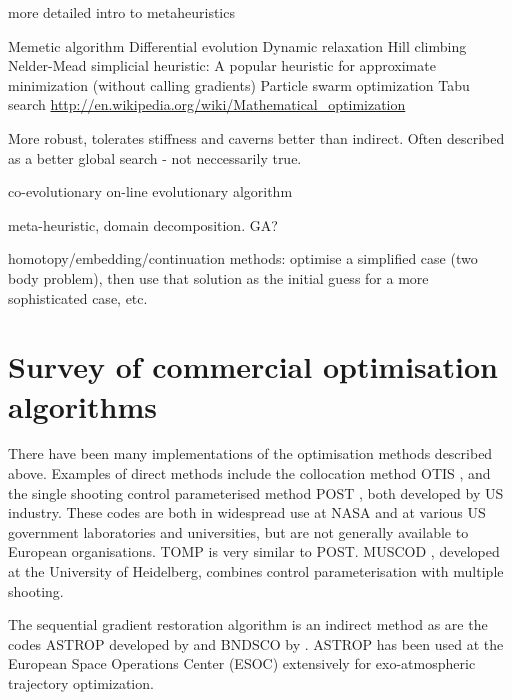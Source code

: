 \textcite{Dreo2006} more detailed intro to metaheuristics

Memetic algorithm
Differential evolution
Dynamic relaxation
Hill climbing
Nelder-Mead simplicial heuristic: A popular heuristic for approximate minimization (without calling gradients)
Particle swarm optimization
Tabu search
\url{http://en.wikipedia.org/wiki/Mathematical_optimization}

More robust, tolerates stiffness and caverns better than indirect. Often described as a better global search - not neccessarily true.

\cite{Hughes2004} co-evolutionary on-line evolutionary algorithm

\cite{Vasile2009} meta-heuristic, domain decomposition. GA?


homotopy/embedding/continuation methods: optimise a simplified case (two body problem), then use that solution as the initial guess for a more sophisticated case, etc.



\section{Survey of commercial optimisation algorithms} \label{sec:Algorithms}

There have been many implementations of the optimisation methods described above. Examples of direct methods include the collocation method OTIS \parencite[Optimal Trajectories by Implicit Simulation, ][]{Hargraves1987}, and the single shooting control parameterised method POST \parencite[Program to Optimize Simulated Trajectories, ][]{Brauer1977}, both developed by US industry. These codes are both in widespread use at NASA and at various US government laboratories and universities, but are not generally available to European organisations. TOMP \parencite[Trajectory Optimization by Mathematical Programming, ][]{Kraft1994} is very similar to POST. MUSCOD \parencite[Multiple Shooting Code for optimization, ][]{Bock1984}, developed at the University of Heidelberg, combines control parameterisation with multiple shooting. 

The sequential gradient restoration algorithm \parencite[SGRA, ][]{Miele1975} is an indirect method as are the codes ASTROP developed by \textcite{Bartholomew-Biggs1988} and BNDSCO by \textcite{Bulirsch1971}. ASTROP has been used at the European Space Operations Center (ESOC) extensively for exo-atmospheric trajectory optimization. 

